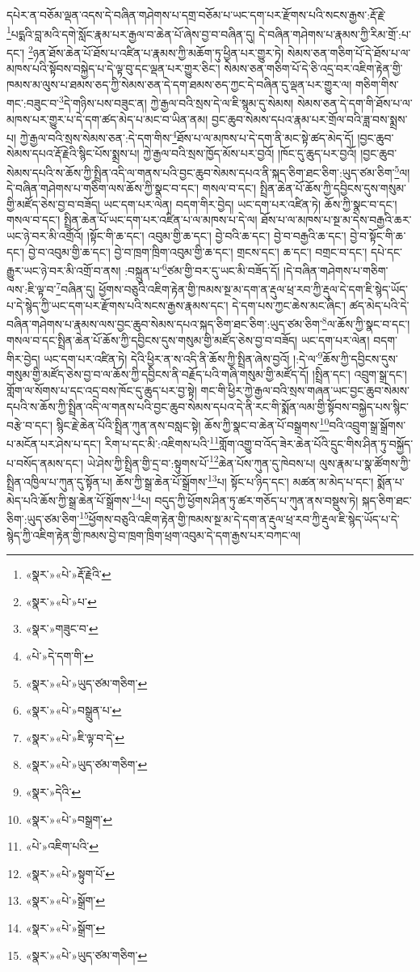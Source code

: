 དཔེར་ན་བཅོམ་ལྡན་འདས་དེ་བཞིན་གཤེགས་པ་དགྲ་བཅོམ་པ་ཡང་དག་པར་རྫོགས་པའི་སངས་རྒྱས་:རྡོ་རྗེ་\footnote{«སྣར་»«པེ་»རྡོ་རྗེའི་}པདྨའི་བླ་མའི་དགེ་སློང་རྣམ་པར་རྒྱལ་བ་ཆེན་པོ་ཞེས་བྱ་བ་བཞིན་དུ། དེ་བཞིན་གཤེགས་པ་རྣམས་ཀྱི་རིམ་གྲོ་:པ་དང་། \footnote{«སྣར་»«པེ་»པ་}ཉན་ཐོས་ཆེན་པོ་ཐོས་པ་འཛིན་པ་རྣམས་ཀྱི་མཆོག་ཏུ་ཕྱིན་པར་གྱུར་ཏེ། སེམས་ཅན་གཅིག་པོ་དེ་ཐོས་པ་ལ་མཁས་པའི་སྟོབས་བསྐྱེད་པ་དེ་ལྟ་བུ་དང་ལྡན་པར་གྱུར་ཅིང་། སེམས་ཅན་གཅིག་པོ་དེ་ཅི་འདྲ་བར་འཇིག་རྟེན་གྱི་ཁམས་མ་ལུས་པ་ཐམས་ཅད་ཀྱི་སེམས་ཅན་དེ་དག་ཐམས་ཅད་ཀྱང་དེ་བཞིན་དུ་ལྡན་པར་གྱུར་ལ། གཅིག་གིས་གང་:བཟུང་བ་\footnote{«སྣར་»གཟུང་བ་}དེ་གཉིས་པས་བཟུང་ན། ཀྱེ་རྒྱལ་བའི་སྲས་དེ་ལ་ཇི་སྙམ་དུ་སེམས། སེམས་ཅན་དེ་དག་གི་ཐོས་པ་ལ་མཁས་པར་གྱུར་པ་དེ་དག་ཚད་མེད་པ་མང་བ་ཡིན་ནམ། བྱང་ཆུབ་སེམས་དཔའ་རྣམ་པར་གྲོལ་བའི་ཟླ་བས་སྨྲས་པ། ཀྱེ་རྒྱལ་བའི་སྲས་སེམས་ཅན་:དེ་དག་གིས་\footnote{«པེ་»དེ་དག་གི་}ཐོས་པ་ལ་མཁས་པ་དེ་དག་ནི་མང་སྟེ་ཚད་མེད་དོ། །བྱང་ཆུབ་སེམས་དཔའ་རྡོ་རྗེའི་སྙིང་པོས་སྨྲས་པ། ཀྱེ་རྒྱལ་བའི་སྲས་ཁྱོད་མོས་པར་བྱའོ། །ཁོང་དུ་ཆུད་པར་བྱའོ། །བྱང་ཆུབ་སེམས་དཔའི་ས་ཆོས་ཀྱི་སྤྲིན་འདི་ལ་གནས་པའི་བྱང་ཆུབ་སེམས་དཔའ་ནི་སྐད་ཅིག་ཐང་ཅིག་:ཡུད་ཙམ་ཅིག་\footnote{«སྣར་»«པེ་»ཡུད་ཙམ་གཅིག་}ལ། དེ་བཞིན་གཤེགས་པ་གཅིག་ལས་ཆོས་ཀྱི་སྣང་བ་དང་། གསལ་བ་དང་། སྤྲིན་ཆེན་པོ་ཆོས་ཀྱི་དབྱིངས་དུས་གསུམ་གྱི་མཛོད་ཅེས་བྱ་བ་བཟོད། ཡང་དག་པར་ལེན། བདག་གིར་བྱེད། ཡང་དག་པར་འཛིན་ཏེ། ཆོས་ཀྱི་སྣང་བ་དང་། གསལ་བ་དང་། སྤྲིན་ཆེན་པོ་ཡང་དག་པར་འཛིན་པ་ལ་མཁས་པ་དེ་ལ། ཐོས་པ་ལ་མཁས་པ་སྔ་མ་དེས་བརྒྱའི་ཆར་ཡང་ཉེ་བར་མི་འགྲོའོ། །སྟོང་གི་ཆ་དང་། འབུམ་གྱི་ཆ་དང་། བྱེ་བའི་ཆ་དང་། བྱེ་བ་བརྒྱའི་ཆ་དང་། བྱེ་བ་སྟོང་གི་ཆ་དང་། བྱེ་བ་འབུམ་གྱི་ཆ་དང་། བྱེ་བ་ཁྲག་ཁྲིག་འབུམ་གྱི་ཆ་དང་། གྲངས་དང་། ཆ་དང་། བགྲང་བ་དང་། དཔེ་དང་རྒྱུར་ཡང་ཉེ་བར་མི་འགྲོ་བ་ནས། :བསྐྲུན་པ་\footnote{«སྣར་»«པེ་»བསྒྲུན་པ་}ཙམ་གྱི་བར་དུ་ཡང་མི་བཟོད་དོ། །དེ་བཞིན་གཤེགས་པ་གཅིག་ལས་:ཇི་ལྟ་བ་\footnote{«སྣར་»«པེ་»ཇི་ལྟ་བ་དེ་}བཞིན་དུ། ཕྱོགས་བཅུའི་འཇིག་རྟེན་གྱི་ཁམས་སྔ་མ་དག་ན་རྡུལ་ཕྲ་རབ་ཀྱི་རྡུལ་དེ་དག་ཇི་སྙེད་ཡོད་པ་དེ་སྙེད་ཀྱི་ཡང་དག་པར་རྫོགས་པའི་སངས་རྒྱས་རྣམས་དང་། དེ་དག་པས་ཀྱང་ཆེས་མང་ཞིང་། ཚད་མེད་པའི་དེ་བཞིན་གཤེགས་པ་རྣམས་ལས་བྱང་ཆུབ་སེམས་དཔའ་སྐད་ཅིག་ཐང་ཅིག་:ཡུད་ཙམ་ཅིག་\footnote{«སྣར་»«པེ་»ཡུད་ཙམ་གཅིག་}ལ་ཆོས་ཀྱི་སྣང་བ་དང་། གསལ་བ་དང་སྤྲིན་ཆེན་པོ་ཆོས་ཀྱི་དབྱིངས་དུས་གསུམ་གྱི་མཛོད་ཅེས་བྱ་བ་བཟོད། ཡང་དག་པར་ལེན། བདག་གིར་བྱེད། ཡང་དག་པར་འཛིན་ཏེ། དེའི་ཕྱིར་ན་ས་འདི་ནི་ཆོས་ཀྱི་སྤྲིན་ཞེས་བྱའོ། །:དེ་ལ་\footnote{«སྣར་»དེའི་}ཆོས་ཀྱི་དབྱིངས་དུས་གསུམ་གྱི་མཛོད་ཅེས་བྱ་བ་ལ་ཆོས་ཀྱི་དབྱིངས་ནི་བརྗོད་པའི་གཞི་གསུམ་གྱི་མཛོད་དོ། །སྤྲིན་དང་། འབྲུག་སྒྲ་དང་། གློག་ལ་སོགས་པ་དང་འདྲ་བས་ཁོང་དུ་ཆུད་པར་བྱ་སྟེ། གང་གི་ཕྱིར་ཀྱེ་རྒྱལ་བའི་སྲས་གཞན་ཡང་བྱང་ཆུབ་སེམས་དཔའི་ས་ཆོས་ཀྱི་སྤྲིན་འདི་ལ་གནས་པའི་བྱང་ཆུབ་སེམས་དཔའ་དེ་ནི་རང་གི་སྨོན་ལམ་གྱི་སྟོབས་བསྐྱེད་པས་སྙིང་བརྩེ་བ་དང་། སྙིང་རྗེ་ཆེན་པོའི་སྤྲིན་ཀུན་ནས་བསླང་སྟེ། ཆོས་ཀྱི་སྣང་བ་ཆེན་པོ་བསྒྲགས་\footnote{«སྣར་»«པེ་»བསྒྲག་}བའི་འབྲུག་སྒྲ་སྒྲོགས་པ་མངོན་པར་ཤེས་པ་དང་། རིག་པ་དང་མི་:འཇིགས་པའི་\footnote{«པེ་»འཇིག་པའི་}གློག་འགྱུ་བ་འོད་ཟེར་ཆེན་པོའི་དྲུང་གིས་ཤིན་ཏུ་བསྐྱོད་པ་བསོད་ནམས་དང་། ཡེ་ཤེས་ཀྱི་སྤྲིན་གྱི་དྲ་བ་:སྟུགས་པོ་\footnote{«སྣར་»«པེ་»སྟུག་པོ་}ཆེན་པོས་ཀུན་དུ་ཁེབས་པ། ལུས་རྣམ་པ་སྣ་ཚོགས་ཀྱི་སྤྲིན་འཁྱིལ་པ་ཀུན་དུ་སྟོན་པ། ཆོས་ཀྱི་སྒྲ་ཆེན་པོ་སྒྲོགས་\footnote{«སྣར་»«པེ་»སྒྲོག་}པ། སྟོང་པ་ཉིད་དང་། མཚན་མ་མེད་པ་དང་། སྨོན་པ་མེད་པའི་ཆོས་ཀྱི་སྒྲ་ཆེན་པོ་སྒྲོགས་\footnote{«སྣར་»«པེ་»སྒྲོག་}པ། བདུད་ཀྱི་ཕྱོགས་ཤིན་ཏུ་ཚར་གཅོད་པ་ཀུན་ནས་བསྡུས་ཏེ། སྐད་ཅིག་ཐང་ཅིག་:ཡུད་ཙམ་ཅིག་\footnote{«སྣར་»«པེ་»ཡུད་ཙམ་གཅིག་}ཕྱོགས་བཅུའི་འཇིག་རྟེན་གྱི་ཁམས་སྔ་མ་དེ་དག་ན་རྡུལ་ཕྲ་རབ་ཀྱི་རྡུལ་ཇི་སྙེད་ཡོད་པ་དེ་སྙེད་ཀྱི་འཇིག་རྟེན་གྱི་ཁམས་བྱེ་བ་ཁྲག་ཁྲིག་ཕྲག་འབུམ་དེ་དག་རྒྱས་པར་བཀང་ལ། 